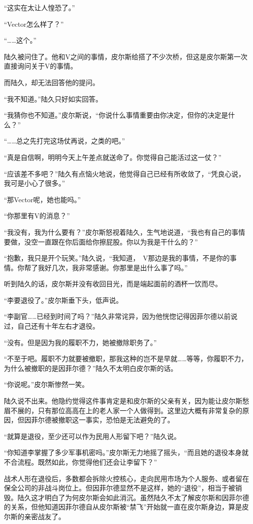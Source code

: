 “这实在太让人惶恐了。”

“Vector怎么样了？”

“……这个。”

陆久被问住了。他和V之间的事情，皮尔斯给搭了不少次桥，但这是皮尔斯第一次直接询问关于V的事情。

而陆久，却无法回答他的提问。

“我不知道。”陆久只好如实回答。

“我猜你也不知道。”皮尔斯说，“你说什么事情重要由你决定，但你的决定是什么？”

“……总之先打完这场仗再说，之类的吧。”

“真是自信啊，明明今天上午差点就送命了。你觉得自己能活过这一仗？”

“应该差不多吧？”陆久有点恼火地说，他觉得自己已经有所收敛了，“凭良心说，我可是小心了很多。”

“那Vector呢，她也能吗。”

“你那里有V的消息？”

“我没有，我为什么要有？”皮尔斯怒视着陆久，生气地说道，“我也有自己的事情要做，没空一直跟在你后面给你擦屁股。你以为我是干什么的？”

“抱歉，我只是开个玩笑。”陆久说，“我知道， V那边是我的事情，不是你的事情。你帮了我好几次，我非常感谢。你那里是出什么事了吗。”

听到陆久的话，皮尔斯并没有收回目光，而是端起面前的酒杯一饮而尽。

“李要退役了。”皮尔斯垂下头，低声说。

“李副官……已经到时间了吗？”陆久非常诧异，因为他恍惚记得因菲尔德以前说过，自己还有十年左右才退役。

“没有。但是因为我的履职不力，她被撤除职务了。”

“不至于吧。履职不力就要被撤职，那我这种的岂不是早就……等等，你履职不力，为什么被撤职的是因菲尔德？”陆久不太明白皮尔斯的话。

“你说呢。”皮尔斯惨然一笑。

陆久说不出来。他隐约觉得这件事肯定是和皮尔斯的父亲有关，因为能让皮尔斯愁眉不展的，只有那位高高在上的老人家一个人做得到。这里边大概有非常复杂的原因，但因菲尔德被撤职这一事实，恐怕是无法避免的了。

“就算是退役，至少还可以作为民用人形留下吧？”陆久说。

“你知道李掌握了多少军事机密吗。”皮尔斯无力地摇了摇头，“而且她的退役本身就不合流程。既然如此，你觉得他们还会让李留下？”

战术人形在退役后，多数都会拆除火控核心，走向民用市场为个人服务、或者留在保全公司的非战斗岗位上。但因菲尔德显然不是这样，她的“退役”，相当于被销毁。陆久这才明白了为何皮尔斯会如此消沉。虽然陆久不太了解皮尔斯和因菲尔德的关系，但他知道因菲尔德自从皮尔斯被“禁飞”开始就一直在皮尔斯身边，算是皮尔斯的亲密战友了。

